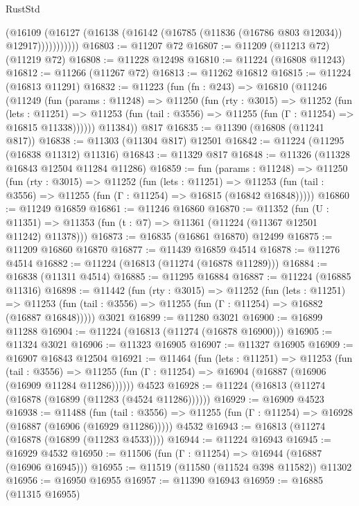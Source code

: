 \begin{lexlean}{RustStd}
\begin{coremodule}
                (@16109
                  (@16127 (@16138 (@16142 (@16785 (@11836 (@16786 @803 @12034)) @12917)))))))))))
@16803 := @11207 @72
@16807 := @11209 (@11213 @72) (@11219 @72)
@16808 := @11228 @12498
@16810 := @11224 (@16808 @11243)
@16812 := @11266 (@11267 @72)
@16813 := @11262 @16812
@16815 := @11224 (@16813 @11291)
@16832 := @11223
    (fun (fn : @243) =>
    @16810
      (@11246
        (@11249
          (fun (params : @11248) =>
          @11250
            (fun (rty : @3015) =>
            @11252
              (fun (lets : @11251) =>
              @11253 (fun (tail : @3556) => @11255 (fun (Γ : @11254) => @16815 @11338))))))
        @11384))
    @817
@16835 := @11390 (@16808 (@11241 @817))
@16838 := @11303 (@11304 @817) @12501
@16842 := @11224 (@11295 (@16838 @11312) @11316)
@16843 := @11329 @817
@16848 := @11326 (@11328 @16843 @12504 @11284 @11286)
@16859 := fun (params : @11248) =>
  @11250
    (fun (rty : @3015) =>
    @11252
      (fun (lets : @11251) =>
      @11253 (fun (tail : @3556) => @11255 (fun (Γ : @11254) => @16815 (@16842 @16848)))))
@16860 := @11249 @16859
@16861 := @11246 @16860
@16870 := @11352
    (fun (U : @11351) => @11353 (fun (t : @7) => @11361 (@11224 (@11367 @12501 @11242) @11378)))
@16873 := @16835 (@16861 @16870) @12499
@16875 := @11209 @16860 @16870
@16877 := @11439 @16859 @4514
@16878 := @11276 @4514
@16882 := @11224 (@16813 (@11274 (@16878 @11289)))
@16884 := @16838 (@11311 @4514)
@16885 := @11295 @16884
@16887 := @11224 (@16885 @11316)
@16898 := @11442
    (fun (rty : @3015) =>
    @11252
      (fun (lets : @11251) =>
      @11253 (fun (tail : @3556) => @11255 (fun (Γ : @11254) => @16882 (@16887 @16848)))))
    @3021
@16899 := @11280 @3021
@16900 := @16899 @11288
@16904 := @11224 (@16813 (@11274 (@16878 @16900)))
@16905 := @11324 @3021
@16906 := @11323 @16905
@16907 := @11327 @16905
@16909 := @16907 @16843 @12504
@16921 := @11464
    (fun (lets : @11251) =>
    @11253
      (fun (tail : @3556) =>
      @11255 (fun (Γ : @11254) => @16904 (@16887 (@16906 (@16909 @11284 @11286))))))
    @4523
@16928 := @11224 (@16813 (@11274 (@16878 (@16899 (@11283 (@4524 @11286))))))
@16929 := @16909 @4523
@16938 := @11488
    (fun (tail : @3556) => @11255 (fun (Γ : @11254) => @16928 (@16887 (@16906 (@16929 @11286)))))
    @4532
@16943 := @16813 (@11274 (@16878 (@16899 (@11283 @4533))))
@16944 := @11224 @16943
@16945 := @16929 @4532
@16950 := @11506 (fun (Γ : @11254) => @16944 (@16887 (@16906 @16945)))
@16955 := @11519 (@11580 (@11524 @398 @11582)) @11302
@16956 := @16950 @16955
@16957 := @11390 @16943
@16959 := @16885 (@11315 @16955)

\end{coremodule}
\end{lexlean}
